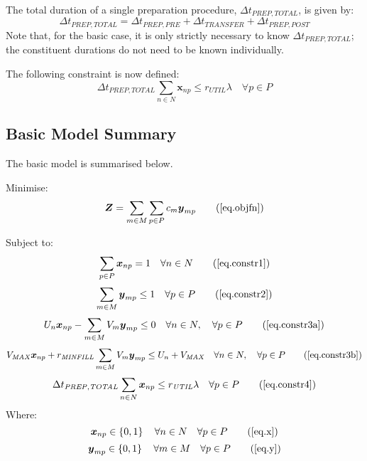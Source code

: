 The total duration of a single preparation procedure,
$\Delta t_{\mathit{PREP,TOTAL}}$, is given by:
\begin{equation}
    \Delta t_{\mathit{PREP,TOTAL}} = \Delta t_{\mathit{PREP,PRE}} + 
    \Delta t_{\mathit{TRANSFER}} + \Delta t_{\mathit{PREP,POST}}
\end{equation}
Note that, for the basic case, it is only strictly necessary to know
$\Delta t_{\mathit{PREP,TOTAL}}$; the constituent durations do not need to be
known individually.

The following constraint is now defined:
\begin{equation}
    \Delta t_{\mathit{PREP,TOTAL}} \sum_{n \in N} \boldsymbol{x}_{np} \le
    r_{\mathit{UTIL}} \lambda \quad \forall p \in P
    \label{eq.constr4}
\end{equation}

\subsection{Basic Model Summary}\label{SS.basicsummary}

The basic model is summarised below.

Minimise:
\begin{equation}
    \boldsymbol{Z} = \sum_{m \in M} \sum_{p \in P} c_m \boldsymbol{y}_{mp}
    \tag{\ref{eq.objfn}}
\end{equation}

Subject to:
\begin{equation}
    \sum_{p \in P} \boldsymbol{x}_{np} = 1 \quad \forall n \in N
    \tag{\ref{eq.constr1}}
\end{equation}
\begin{equation}
    \sum_{m \in M} \boldsymbol{y}_{mp} \le 1 \quad \forall p \in P
    \tag{\ref{eq.constr2}}
\end{equation}
\begin{equation}
    U_{n} \boldsymbol{x}_{np} - \sum_{m \in M} V_{m} \boldsymbol{y}_{mp} \le 0
    \quad \forall n \in N, \quad \forall p \in P
    \tag{\ref{eq.constr3a}}
\end{equation}
\begin{equation}
    V_{\mathit{MAX}} \boldsymbol{x}_{np} + r_{\mathit{MINFILL}} \sum_{m \in M}
    V_{m} \boldsymbol{y}_{mp} \le U_{n} + V_{\mathit{MAX}} \quad \forall n \in
    N, \quad \forall p \in P
    \tag{\ref{eq.constr3b}}
\end{equation}
\begin{equation}
    \Delta t_{\mathit{PREP,TOTAL}} \sum_{n \in N} \boldsymbol{x}_{np} \le
    r_{\mathit{UTIL}} \lambda \quad \forall p \in P
    \tag{\ref{eq.constr4}}
\end{equation}
Where:
\begin{equation}
    \boldsymbol{x}_{np} \in \left\{ 0, 1 \right\} \quad \forall n \in N \quad
    \forall p \in P
    \tag{\ref{eq.x}}
\end{equation}
\begin{equation}
    \boldsymbol{y}_{mp} \in \left\{ 0, 1 \right\} \quad \forall m \in M \quad
    \forall p \in P
    \tag{\ref{eq.y}}
\end{equation}

